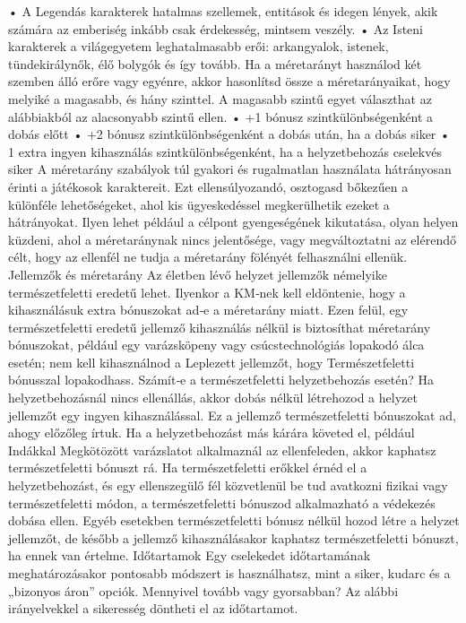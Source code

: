 \documentclass[oneside]{book}
\begin{document}
    • A Legendás karakterek hatalmas szellemek, entitások és idegen lények, akik számára az emberiség inkább csak érdekesség, mintsem veszély.
    • Az Isteni karakterek a világegyetem leghatalmasabb erői: arkangyalok, istenek, tündekirálynők, élő bolygók és így tovább.
Ha a méretarányt használod két szemben álló erőre vagy egyénre, akkor hasonlítsd össze a méretarányaikat, hogy melyiké a magasabb, és hány szinttel. A magasabb szintű egyet választhat az alábbiakból az alacsonyabb szintű ellen.
    • +1 bónusz szintkülönbségenként a dobás előtt
    • +2 bónusz szintkülönbségenként a dobás után, ha a dobás siker
    • 1 extra ingyen kihasználás szintkülönbségenként, ha a helyzetbehozás cselekvés siker
A méretarány szabályok túl gyakori és rugalmatlan használata hátrányosan érinti a játékosok karaktereit. Ezt ellensúlyozandó, osztogasd bőkezűen a különféle lehetőségeket, ahol kis ügyeskedéssel megkerülhetik ezeket a hátrányokat. Ilyen lehet például a célpont gyengeségének kikutatása, olyan helyen küzdeni, ahol a méretaránynak nincs jelentősége, vagy megváltoztatni az elérendő célt, hogy az ellenfél ne tudja a méretarány fölényét felhasználni ellenük.
Jellemzők és méretarány
Az életben lévő helyzet jellemzők némelyike természetfeletti eredetű lehet. Ilyenkor a KM‑nek kell eldöntenie, hogy a kihasználásuk extra bónuszokat ad‑e a méretarány miatt. Ezen felül, egy természetfeletti eredetű jellemző kihasználás nélkül is biztosíthat méretarány bónuszokat, például egy varázsköpeny vagy csúcstechnológiás lopakodó álca esetén; nem kell kihasználnod a Leplezett jellemzőt, hogy Természetfeletti bónusszal lopakodhass.
Számít‑e a természetfeletti helyzetbehozás esetén?
Ha helyzetbehozásnál nincs ellenállás, akkor dobás nélkül létrehozod a helyzet jellemzőt egy ingyen kihasználással. Ez a jellemző természetfeletti bónuszokat ad, ahogy előzőleg írtuk.
Ha a helyzetbehozást más kárára követed el, például Indákkal Megkötözött varázslatot alkalmaznál az ellenfeleden, akkor kaphatsz természetfeletti bónuszt rá.
Ha természetfeletti erőkkel érnéd el a helyzetbehozást, és egy ellenszegülő fél közvetlenül be tud avatkozni fizikai vagy természetfeletti módon, a természetfeletti bónuszod alkalmazható a védekezés dobása ellen.
Egyéb esetekben természetfeletti bónusz nélkül hozod létre a helyzet jellemzőt, de később a jellemző kihasználásakor kaphatsz természetfeletti bónuszt, ha ennek van értelme.
Időtartamok
Egy cselekedet időtartamának meghatározásakor pontosabb módszert is használhatsz, mint a siker, kudarc és a „bizonyos áron” opciók. Mennyivel tovább vagy gyorsabban? Az alábbi irányelvekkel a sikeresség döntheti el az időtartamot.
\end{document}
